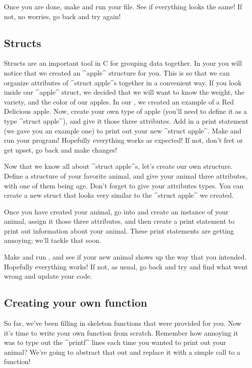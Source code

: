 \documentclass{tufte-handout}
\begin{document}
Once you are done, make and run your file.  See if everything looks the same!  If not, no worries, go back and try again!


\subsection{Structs}


Structs are an important tool in C for grouping data together.  In your
 you will notice that we created an ^apple^ structure
for you.  This is so that we can
organize attributes of ^struct apple^s together in a convenient way.  If
you look inside our ^apple^ struct, we decided that we will want to know
the weight, the variety, and the color of our apples.  In our
, we created an example of a Red Delicious apple.
Now, create your own type of apple (you'll need to define it as a type
^struct apple^), and give it those three attributes.  Add in a print
statement (we gave you an example one) to print out your new ^struct
apple^.  Make and run your  program!  Hopefully everything
works as expected!  If not, don't fret or get upset, go back and make
changes!

Now that we know all about ^struct apple^s, let's create our own
structure. Define a structure of your favorite animal, and give your
animal three attributes, with one of them being age. Don't forget to
give your attributes types. You can create a new struct that looks very
similar to the ^struct apple^ we created.

Once you have created your animal, go into  and
create an instance of your animal, assign it those three attributes, and
then create a print statement to print out information about your
animal.  These print statements are getting annoying; we'll tackle that
soon.

Make and run , and see if your new animal shows up the way that
you intended.  Hopefully everything works!  If not, as usual, go back
and try and find what went wrong and update your code.


\subsection{Creating your own function}


So far,
we've been filling in skeleton functions that were provided for
you. Now it's time to write your own function from scratch.  Remember
how annoying it was to type out the ^printf^ lines each
time you wanted to print out your animal?  We're going to abstract that
out and replace it with a simple call to a function!
\end{document}
